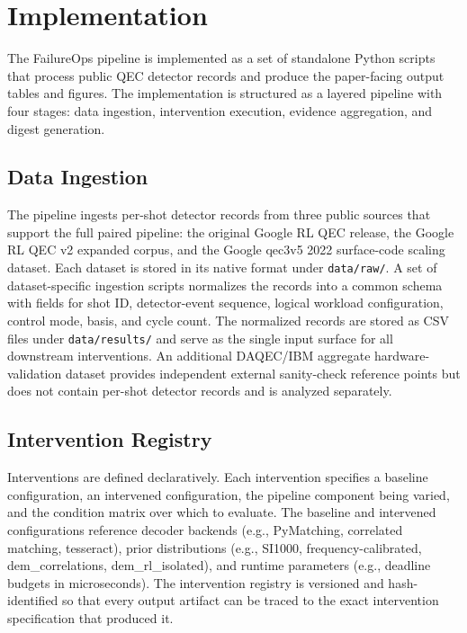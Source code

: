 \section{Implementation}

The FailureOps pipeline is implemented as a set of standalone Python scripts that process public QEC detector records and produce the paper-facing output tables and figures. The implementation is structured as a layered pipeline with four stages: data ingestion, intervention execution, evidence aggregation, and digest generation.

\subsection{Data Ingestion}

The pipeline ingests per-shot detector records from three public sources that support the full paired pipeline: the original Google RL QEC release, the Google RL QEC v2 expanded corpus, and the Google qec3v5 2022 surface-code scaling dataset. Each dataset is stored in its native format under \texttt{data/raw/}. A set of dataset-specific ingestion scripts normalizes the records into a common schema with fields for shot ID, detector-event sequence, logical workload configuration, control mode, basis, and cycle count. The normalized records are stored as CSV files under \texttt{data/results/} and serve as the single input surface for all downstream interventions. An additional DAQEC/IBM aggregate hardware-validation dataset provides independent external sanity-check reference points but does not contain per-shot detector records and is analyzed separately.

\subsection{Intervention Registry}

Interventions are defined declaratively. Each intervention specifies a baseline configuration, an intervened configuration, the pipeline component being varied, and the condition matrix over which to evaluate. The baseline and intervened configurations reference decoder backends (e.g., PyMatching, correlated matching, tesseract), prior distributions (e.g., SI1000, frequency-calibrated, dem\_correlations, dem\_rl\_isolated), and runtime parameters (e.g., deadline budgets in microseconds). The intervention registry is versioned and hash-identified so that every output artifact can be traced to the exact intervention specification that produced it.

